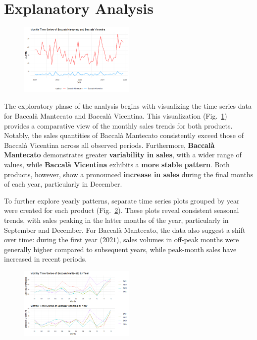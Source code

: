 \documentclass[10pt,twocolumn,letterpaper]{article}
\begin{document}
\section{Explanatory Analysis}

\begin{figure}[h!]
    \centering
    \includegraphics[width=0.5\textwidth]{PlotsBEFD/SS_MAN_VIC.png} 
    \caption{}
    \label{fig:SS_MAN_VIC}
\end{figure}

The exploratory phase of the analysis begins with visualizing the time series data for Baccalà Mantecato and Baccalà Vicentina. This visualization (Fig.~\ref{fig:SS_MAN_VIC}) provides a comparative view of the monthly sales trends for both products. Notably, the sales quantities of Baccalà Mantecato consistently exceed those of Baccalà Vicentina across all observed periods. Furthermore, \textbf{Baccalà Mantecato} demonstrates greater \textbf{variability in sales}, with a wider range of values, while \textbf{Baccalà Vicentina} exhibits a \textbf{more stable pattern}. Both products, however, show a pronounced \textbf{increase in sales} during the final months of each year, particularly in December.

To further explore yearly patterns, separate time series plots grouped by year were created for each product (Fig.~\ref{fig:Month_SS_MAN_VIC}). These plots reveal consistent seasonal trends, with sales peaking in the latter months of the year, particularly in September and December. For Baccalà Mantecato, the data also suggest a shift over time: during the first year ($2021$), sales volumes in off-peak months were generally higher compared to subsequent years, while peak-month sales have increased in recent periods.

\begin{figure}[h!]
    \centering
    \includegraphics[width=0.5\textwidth]{PlotsBEFD/Month_SS_MAN_VIC.png} 
    \caption{}
    \label{fig:Month_SS_MAN_VIC}
\end{figure}
\end{document}
